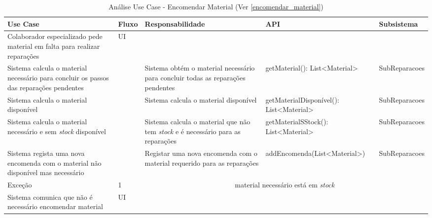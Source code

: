 \documentclass[../relatorio.tex]{subfiles}
\begin{document}
\begin{landscape}
    \begin{table}[!h]
        \centering
        \begin{tabular}{|p{5cm}|p{1cm}|p{4cm}|p{6cm}|p{3cm}|}
            \hline
            \rowcolor{gray!20!white}
            Use Case & Fluxo & Responsabilidade & API & Subsistema \\
            \hline
            \rowcolor{yellow}
            Colaborador especializado pede material em falta para realizar reparações
                     & UI
                     &
                     &
                     &
            \\
            \hline
            Sistema calcula o material necessário para concluir os passos das reparações pendentes
                     &
                     & Sistema obtém o material necessário para concluir todas as reparações pendentes
                     & getMaterial(): List<Material>
                     & SubReparacoes
            \\
            \hline
            Sistema calcula o material disponível
                     &
                     & Sistema calcula o material disponível
                     & getMaterialDisponível(): List<Material>
                     & SubReparacoes
            \\
            \hline
            Sistema calcula o material necessário e sem \textit{stock} disponível
                     &
                     & Sistema calcula o material que não tem \textit{stock} e é necessário para as reparações
                     & getMaterialSStock(): List<Material>
                     & SubReparacoes
            \\
            \hline
            Sistema regista uma nova encomenda com o material não disponível mas necessário
                     &
                     & Registar uma nova encomenda com o material requerido para as reparações	
                     & addEncomenda(List<Material>)
                     & SubReparacoes
            \\
            \hline
            \rowcolor{red!30}
            Exceção
                     & 
            1 
                     & 
            \multicolumn{3}{c}{material necessário está em \textit{stock}}
            \\
            \hline
            \rowcolor{yellow}
            Sistema comunica que não é necessário encomendar material
                    & UI
                    &
                    &
                    &
            \\
            \hline
        \end{tabular}
        \caption{Análise Use Case - Encomendar Material (Ver \ref{encomendar_material})}
    \end{table}
\end{landscape}
\end{document}
